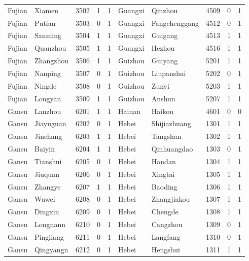 \documentclass[12pt]{article}
\begin{document}
\begin{table}[!htbp]
\begin{adjustbox}{width=\textwidth, totalheight=\baselineskip,keepaspectratio}
\begin{tabular}{llllllllll}
Fujian    & Xiamen    & 3502 & 1   & 1   & Guangxi      & Qinzhou       & 4509 & 0   & 1   \\
Fujian    & Putian    & 3503 & 0   & 1   & Guangxi      & Fangchenggang & 4512 & 0   & 1   \\
Fujian    & Sanming   & 3504 & 1   & 1   & Guangxi      & Guigang       & 4513 & 1   & 1   \\
Fujian    & Quanzhou  & 3505 & 1   & 1   & Guangxi      & Hezhou        & 4516 & 1   & 1   \\
Fujian    & Zhangzhou & 3506 & 1   & 1   & Guizhou      & Guiyang       & 5201 & 1   & 1   \\
Fujian    & Nanping   & 3507 & 0   & 1   & Guizhou      & Liupanshui    & 5202 & 0   & 1   \\
Fujian    & Ningde    & 3508 & 0   & 1   & Guizhou      & Zunyi         & 5203 & 1   & 1   \\
Fujian    & Longyan   & 3509 & 1   & 1   & Guizhou      & Anshun        & 5207 & 1   & 1   \\
Gansu     & Lanzhou   & 6201 & 1   & 1   & Hainan       & Haikou        & 4601 & 0   & 0   \\
Gansu     & Jiayuguan & 6202 & 0   & 1   & Hebei        & Shijiazhuang  & 1301 & 1   & 1   \\
Gansu     & Jinchang  & 6203 & 1   & 1   & Hebei        & Tangshan      & 1302 & 1   & 1   \\
Gansu     & Baiyin    & 6204 & 1   & 1   & Hebei        & Qinhuangdao   & 1303 & 0   & 1   \\
Gansu     & Tianshui  & 6205 & 0   & 1   & Hebei        & Handan        & 1304 & 1   & 1   \\
Gansu     & Jiuquan   & 6206 & 0   & 1   & Hebei        & Xingtai       & 1305 & 1   & 1   \\
Gansu     & Zhangye   & 6207 & 1   & 1   & Hebei        & Baoding       & 1306 & 1   & 1   \\
Gansu     & Wuwei     & 6208 & 0   & 1   & Hebei        & Zhangjiakou   & 1307 & 1   & 1   \\
Gansu     & Dingxin   & 6209 & 0   & 1   & Hebei        & Chengde       & 1308 & 1   & 1   \\
Gansu     & Longnann  & 6210 & 0   & 1   & Hebei        & Cangzhou      & 1309 & 0   & 1   \\
Gansu     & Pingliang & 6211 & 0   & 1   & Hebei        & Langfang      & 1310 & 0   & 1   \\
Gansu     & Qingyangn & 6212 & 0   & 1   & Hebei        & Hengshui      & 1311 & 1   & 1   \\

\end{tabular}
\end{adjustbox}
\end{table}
\end{document}
